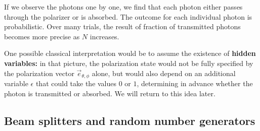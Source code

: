 
If we observe the photons one by one, we find that each photon either passes through the polarizer or is absorbed. The outcome for each individual photon is probabilistic. Over many trials, the result of fraction of transmitted photons becomes more precise as $N$ increases.


One possible classical interpretation would be to assume the existence of \textbf{hidden variables:} in that picture, the polarization state would not be fully specified by the polarization vector $\vec{e}_{\theta,\phi}$ alone, but would also depend on an additional variable $\epsilon$ that could take the values $0$ or $1$, determining in advance whether the photon is transmitted or absorbed. We will return to this idea later. %

\subsection{Beam splitters and random number generators}\label{subsec:4-BS-and-RNG}


